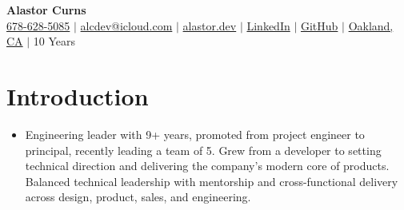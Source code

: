 \documentclass[letterpaper,11pt]{article}
\newcommand{\resumeSubHeadingListStart}{\begin{itemize}[leftmargin=0.08in, label={}]}
\newcommand{\resumeSubHeadingListEnd}{\end{itemize}}
\begin{document}
\begin{center}
  \textbf{\Huge Alastor Curns} \\ \vspace{2pt}
  \faMobile \hspace{.5pt} \href{tel:16786285085}{678-628-5085}
  $|$
  \faPaperPlane \hspace{.5pt} \href{mailto:alcdev@icloud.com}{alcdev@icloud.com}
  $|$
  \faSitemap \hspace{.5pt} \href{https://alastor.dev}{alastor.dev}
  $|$
  \faLinkedinSquare \hspace{.5pt} \href{https://www.linkedin.com/in/alastorc}{LinkedIn}
  $|$
  \faGithub \hspace{.5pt} \href{https://github.com/alastor-lee}{GitHub}
  $|$
  \faGlobe \hspace{.5pt} \href{https://maps.app.goo.gl/CdQMUuxD24zfLjYq7}{Oakland, CA}
  $|$
  \faHistory \hspace{.5pt} 10 Years
\end{center}

\section{Introduction}
\resumeSubHeadingListStart
\item{
            Engineering leader with 9+ years, promoted from project engineer to principal, recently leading a team of 5.
            Grew from a developer to setting technical direction and delivering the company's modern core of products.
            Balanced technical leadership with mentorship and cross-functional delivery across design, product, sales, and engineering.
      }
\resumeSubHeadingListEnd
\end{document}
